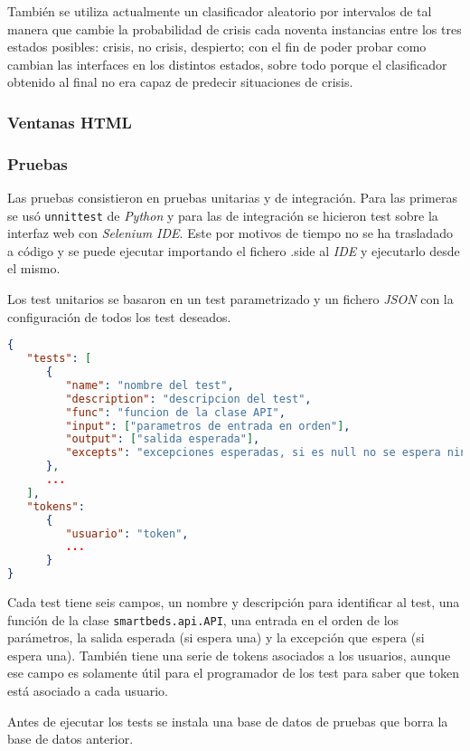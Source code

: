 También se utiliza actualmente un clasificador aleatorio por intervalos de tal manera que cambie la probabilidad de crisis cada noventa instancias entre los tres estados posibles: crisis, no crisis, despierto; con el fin de poder probar como cambian las interfaces en los distintos estados, sobre todo porque el clasificador obtenido al final no era capaz de predecir situaciones de crisis.

\subsubsection{Ventanas HTML}

\subsubsection{Pruebas}
Las pruebas consistieron en pruebas unitarias y de integración. Para las primeras se usó \texttt{unnittest} de \textit{Python} y para las de integración se hicieron test sobre la interfaz web con \textit{Selenium IDE}. Este por motivos de tiempo no se ha trasladado a código y se puede ejecutar importando el fichero .side al \textit{IDE} y ejecutarlo desde el mismo.

Los test unitarios se basaron en un test parametrizado y un fichero \textit{JSON} con la configuración de todos los test deseados.

\begin{lstlisting}[language=JSON]
{
   "tests": [
      {
         "name": "nombre del test",
         "description": "descripcion del test",
         "func": "funcion de la clase API",
         "input": ["parametros de entrada en orden"],
         "output": ["salida esperada"],
         "excepts": "excepciones esperadas, si es null no se espera ninguna"
      },
      ...
   ],
   "tokens": 
      {
         "usuario": "token",
         ...
      }
}
\end{lstlisting}

Cada test tiene seis campos, un nombre y descripción para identificar al test, una función de la clase \texttt{smartbeds.api.API}, una entrada en el orden de los parámetros, la salida esperada (si espera una) y la excepción que espera (si espera una). También tiene una serie de tokens asociados a los usuarios, aunque ese campo es solamente útil para el programador de los test para saber que token está asociado a cada usuario.

Antes de ejecutar los tests se instala una base de datos de pruebas que borra la base de datos anterior.

